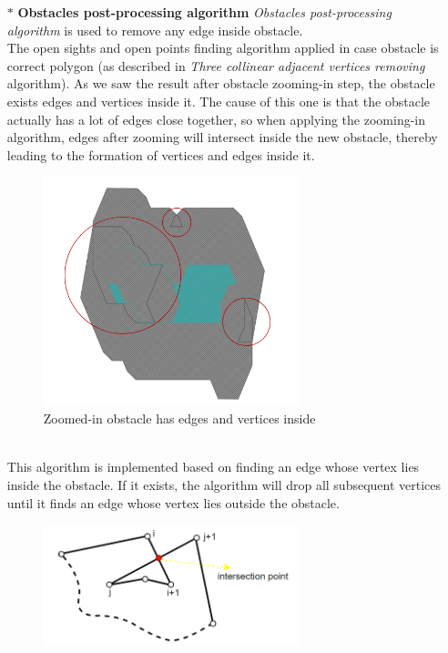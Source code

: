 \documentclass[13pt,a4paper]{article}
\begin{document}
\begin{itemize}
				\item[$\ast$] \textbf{Obstacles post-processing algorithm}
				\textit{Obstacles post-processing algorithm} is used to remove any edge inside obstacle.\\
				The open sights and open points finding algorithm applied in case obstacle is correct polygon (as described in \textit{Three collinear adjacent vertices removing} algorithm). As we saw the result after obstacle zooming-in step, the obstacle exists edges and vertices inside it. The cause of this one is that the obstacle actually has a lot of edges close together, so when applying the zooming-in algorithm, edges after zooming will intersect inside the new obstacle, thereby leading to the formation of vertices and edges inside it.\\
				\begin{figure}[!h]
					\centering                                 \includegraphics[width=0.7\textwidth]{Robot_Global_Vision_Update/RGVU_zoom-in_error.png}
					\caption{Zoomed-in obstacle has edges and vertices inside}
				\end{figure} \\
				This algorithm is implemented based on finding an edge whose vertex lies inside the obstacle. If it exists, the algorithm will drop all subsequent vertices until it finds an edge whose vertex lies outside the obstacle. \\
				\begin{figure}[!h]
					\centering                                 \includegraphics[width=0.7\textwidth]{Robot_Global_Vision_Update/RGVU_posprocess.png}

\end{figure}
\end{itemize}
\end{document}
